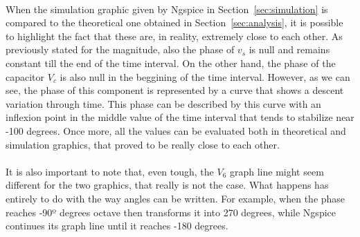 \paragraph{}
When the simulation graphic given by Ngspice in Section~\ref{sec:simulation} is compared to the theoretical one obtained in Section~\ref{sec:analysis}, it is possible to highlight the fact that these are, in reality, extremely close to each other. As previously stated for the magnitude, also the phase of $v_s$ is null and remains constant till the end of the time interval. On the other hand, the phase of the capacitor $V_c$ is also null in the beggining of the time interval. However, as we can see, the phase of this component is represented by a curve that shows a descent variation through time. This phase can be described by this curve with an inflexion point in the middle value of the time interval that tends to stabilize near -100 degrees. Once more, all the values can be evaluated both in theoretical and simulation graphics, that proved to be really close to each other.


\paragraph{}It is also important to note that, even tough, the $V_6$ graph line might seem different for the two graphics, that really is not the case. What happens has entirely to do with the way angles can be written. For example, when the phase reaches -90º degrees octave then transforms it into 270 degrees, while Ngspice continues its graph line until it reaches -180 degrees.















